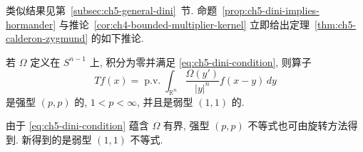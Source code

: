 类似结果见第~\ref{subsec:ch5-general-dini}~节. 命题~\ref{prop:ch5-dini-implies-hormander} 与推论~\ref{cor:ch4-bounded-multiplier-kernel} 立即给出定理~\ref{thm:ch5-calderon-zygmund} 的如下推论.

\begin{Corollary}
\label{cor:ch5-dini-singular-integral}
若 $\Omega$ 定义在 $S^{n-1}$ 上, 积分为零并满足 \eqref{eq:ch5-dini-condition}, 则算子
\[
 Tf(x)=\operatorname{p.v.}\int_{\mathbb R^n}
 \frac{\Omega(y')}{|y|^n}f(x-y)\,dy
\]
是强型 $(p,p)$ 的, $1<p<\infty$, 并且是弱型 $(1,1)$ 的.
\end{Corollary}

\hypertarget{chapter-05-page-106}{}
由于 \eqref{eq:ch5-dini-condition} 蕴含 $\Omega$ 有界, 强型 $(p,p)$ 不等式也可由旋转方法得到. 新得到的是弱型 $(1,1)$ 不等式.
